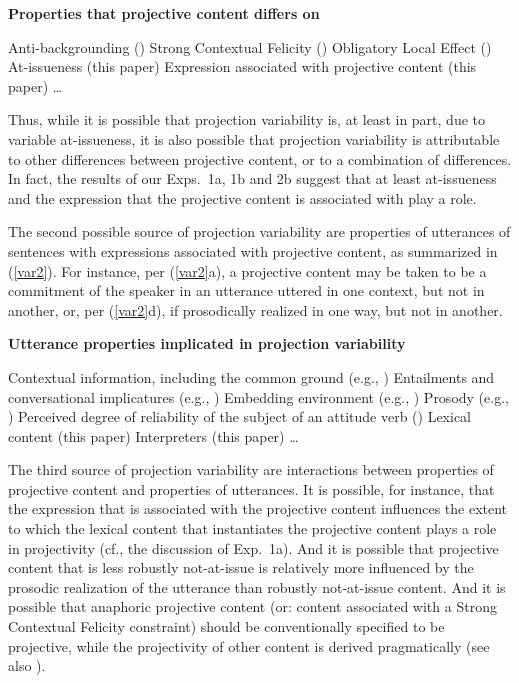 \documentclass[11pt,fleqn]{article}
\newcommand{\6}{\mbox{$[\hspace*{-.6mm}[$}}
\newcommand{\9}{\mbox{$]\hspace*{-.6mm}]$}}
\begin{document}
\begin{exe}
\ex\label{var1} {\bf Properties that projective content differs on}
\begin{xlist}
\ex Anti-backgrounding (\citealt{potts05}) 
\ex Strong Contextual Felicity (\citealt{brst-lang11}) 
\ex Obligatory Local Effect (\citealt{brst-lang11}) 
\ex At-issueness (this paper) 
\ex Expression associated with projective content (this paper) 
\ex \ldots 
\end{xlist}
\end{exe}
Thus, while it is possible that projection variability is, at least in part, due to variable at-issueness, it is also possible that projection variability is attributable to other differences between projective content, or to a combination of differences. In fact, the results of our Exps.~1a, 1b and 2b suggest that at least at-issueness and the expression that the projective content is associated with play a role.


The second possible source of projection variability are properties of utterances of sentences with expressions associated with projective content, as summarized in (\ref{var2}). For instance, per (\ref{var2}a), a projective content may be taken to be a commitment of the speaker in an utterance uttered in one context, but not in another, or, per (\ref{var2}d), if prosodically realized in one way, but not in another. 

\begin{exe}
\ex\label{var2} {\bf Utterance properties implicated in projection variability}
\begin{xlist}
\ex Contextual information, including the common ground (e.g., \citealt{gazdar79a,gazdar79b})
\ex Entailments and conversational implicatures (e.g., \citealt{gazdar79a,gazdar79b})
\ex Embedding environment (e.g., \citealt{smith-hall-cls})
\ex Prosody (e.g., \citealt{abrusan2011,cummins-rohde2015,tonhauser-salt26,stevens-etal2017}) 
\ex Perceived degree of reliability of the subject of an attitude verb (\citealt{schlenker10})
\ex Lexical content (this paper)
\ex Interpreters (this paper)
\ex \ldots 
\end{xlist}
\end{exe}

The third source of projection variability are interactions between properties of projective content and properties of utterances. It is possible, for instance, that the expression that is associated with the projective content influences the extent to which the lexical content that instantiates the projective content plays a role in projectivity (cf., the discussion of Exp.~1a). And it is possible that projective content that is less robustly not-at-issue is relatively more influenced by the prosodic realization of the utterance than robustly not-at-issue content. And it is possible that anaphoric projective content (or: content associated with a Strong Contextual Felicity constraint) should be conventionally specified to be projective, while the projectivity of other content is derived pragmatically (see also \citealt{brst-ar}).
\end{document}
